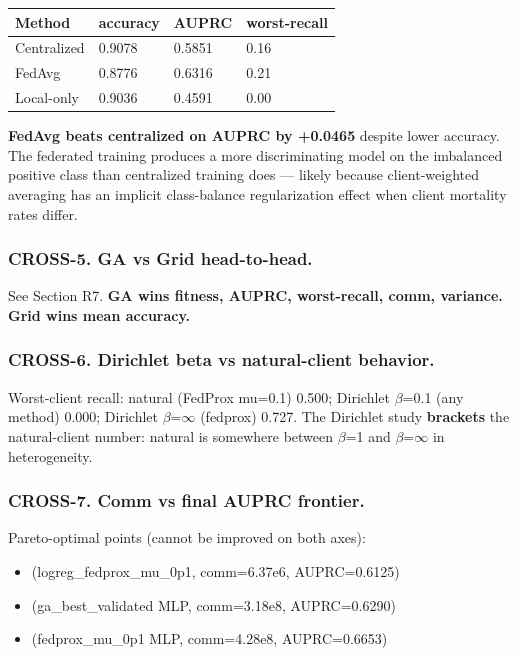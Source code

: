 \documentclass{article}
\begin{document}
\begin{table}[H]
  \centering
  \begin{tabular}{llll}
    \toprule
    Method & accuracy & AUPRC & worst-recall \\
    \midrule
    Centralized & 0.9078 & 0.5851 & 0.16 \\
    FedAvg & 0.8776 & 0.6316 & 0.21 \\
    Local-only & 0.9036 & 0.4591 & 0.00 \\
    \bottomrule
  \end{tabular}
\end{table}


\textbf{FedAvg beats centralized on AUPRC by +0.0465} despite lower accuracy. The federated training produces a more discriminating model on the imbalanced positive class than centralized training does --- likely because client-weighted averaging has an implicit class-balance regularization effect when client mortality rates differ.


\subsubsection{CROSS-5. GA vs Grid head-to-head.}


See Section R7. \textbf{GA wins fitness, AUPRC, worst-recall, comm, variance. Grid wins mean accuracy.}


\subsubsection{CROSS-6. Dirichlet beta vs natural-client behavior.}


Worst-client recall: natural (FedProx mu=0.1) 0.500; Dirichlet \ensuremath{\beta}=0.1 (any method) 0.000; Dirichlet \ensuremath{\beta}=\ensuremath{\infty} (fedprox) 0.727. The Dirichlet study \textbf{brackets} the natural-client number: natural is somewhere between \ensuremath{\beta}=1 and \ensuremath{\beta}=\ensuremath{\infty} in heterogeneity.


\subsubsection{CROSS-7. Comm vs final AUPRC frontier.}


Pareto-optimal points (cannot be improved on both axes):


\begin{itemize}[leftmargin=1.4em,itemsep=2pt,topsep=2pt]
  \item (logreg\_fedprox\_mu\_0p1, comm=6.37e6, AUPRC=0.6125)
  \item (ga\_best\_validated MLP, comm=3.18e8, AUPRC=0.6290)
  \item (fedprox\_mu\_0p1 MLP, comm=4.28e8, AUPRC=0.6653)
\end{itemize}
\end{document}
